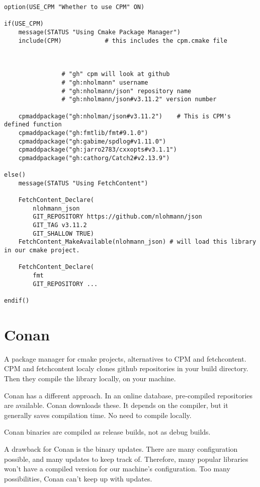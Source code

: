 \documentclass[openany]{report}
\begin{document}
\begin{verbatim}
option(USE_CPM "Whether to use CPM" ON)

if(USE_CPM)
    message(STATUS "Using Cmake Package Manager")
    include(CPM)            # this includes the cpm.cmake file
    


                # "gh" cpm will look at github
                # "gh:nholmann" username
                # "gh:nholmann/json" repository name
                # "gh:nholmann/json#v3.11.2" version number 

    cpmaddpackage("gh:nholman/json#v3.11.2")    # This is CPM's defined function
    cpmaddpackage("gh:fmtlib/fmt#9.1.0")
    cpmaddpackage("gh:gabime/spdlog#v1.11.0")
    cpmaddpackage("gh:jarro2783/cxxopts#v3.1.1")
    cpmaddpackage("gh:cathorg/Catch2#v2.13.9")

else()
    message(STATUS "Using FetchContent")

    FetchContent_Declare(
        nlohmann_json      
        GIT_REPOSITORY https://github.com/nlohmann/json
        GIT_TAG v3.11.2    
        GIT_SHALLOW TRUE)  
    FetchContent_MakeAvailable(nlohmann_json) # will load this library in our cmake project.

    FetchContent_Declare(
        fmt
        GIT_REPOSITORY ...

endif()
\end{verbatim}

\section{Conan}

A package manager for cmake projects, alternatives to CPM and fetchcontent. CPM and fetchcontent localy
clones github repositories in your build directory. Then they compile the library locally, on your machine. 


Conan has a different approach. In an online database, pre-compiled repositories are available.
Conan downloads these. It depends on the compiler, but it generally saves compilation time.
No need to compile locally.

Conan binaries are compiled as release builds, not as debug builds.

A drawback for Conan is the binary updates. There are many configuration possible, and many updates
to keep track of. Therefore, many popular libraries won't have a compiled version for our machine's
configuration. Too many possibilities, Conan can't keep up with updates.
\end{document}
